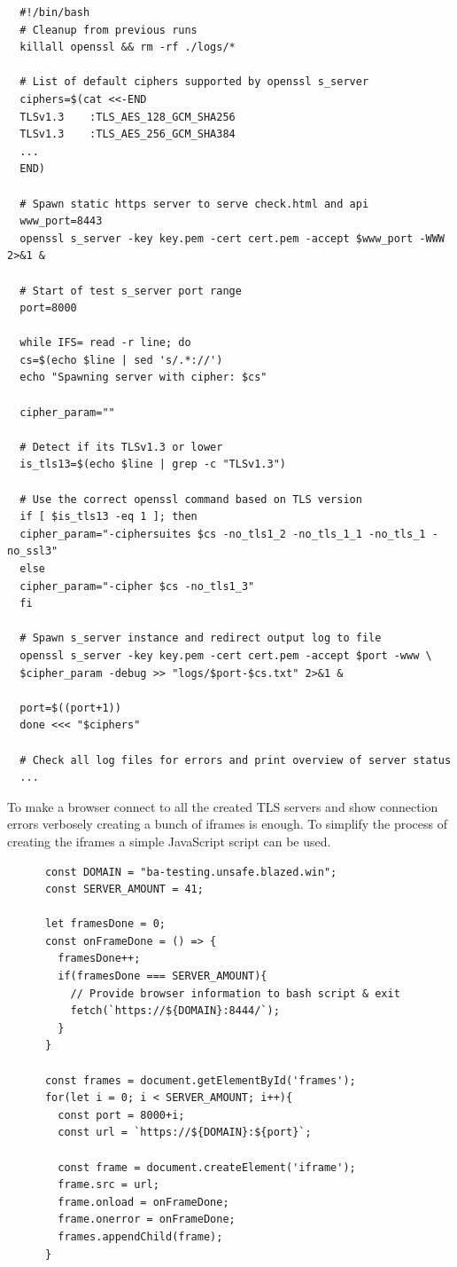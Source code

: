 \documentclass[12pt]{scrbook}
\begin{document}
\newpage

\begin{verbatim}
  #!/bin/bash
  # Cleanup from previous runs
  killall openssl && rm -rf ./logs/*

  # List of default ciphers supported by openssl s_server
  ciphers=$(cat <<-END
  TLSv1.3    :TLS_AES_128_GCM_SHA256
  TLSv1.3    :TLS_AES_256_GCM_SHA384
  ...
  END)

  # Spawn static https server to serve check.html and api
  www_port=8443
  openssl s_server -key key.pem -cert cert.pem -accept $www_port -WWW 2>&1 &

  # Start of test s_server port range
  port=8000

  while IFS= read -r line; do
  cs=$(echo $line | sed 's/.*://')
  echo "Spawning server with cipher: $cs"

  cipher_param=""

  # Detect if its TLSv1.3 or lower
  is_tls13=$(echo $line | grep -c "TLSv1.3")

  # Use the correct openssl command based on TLS version
  if [ $is_tls13 -eq 1 ]; then
  cipher_param="-ciphersuites $cs -no_tls1_2 -no_tls_1_1 -no_tls_1 -no_ssl3"
  else
  cipher_param="-cipher $cs -no_tls1_3"
  fi

  # Spawn s_server instance and redirect output log to file
  openssl s_server -key key.pem -cert cert.pem -accept $port -www \
  $cipher_param -debug >> "logs/$port-$cs.txt" 2>&1 &

  port=$((port+1))
  done <<< "$ciphers"

  # Check all log files for errors and print overview of server status
  ...
\end{verbatim}

\newpage

To make a browser connect to all the created TLS servers and show connection errors verbosely creating a bunch of iframes is enough.
To simplify the process of creating the iframes a simple JavaScript script can be used.

\begin{verbatim}
      const DOMAIN = "ba-testing.unsafe.blazed.win";
      const SERVER_AMOUNT = 41;

      let framesDone = 0;
      const onFrameDone = () => {
        framesDone++;
        if(framesDone === SERVER_AMOUNT){
          // Provide browser information to bash script & exit
          fetch(`https://${DOMAIN}:8444/`);
        }
      }

      const frames = document.getElementById('frames');
      for(let i = 0; i < SERVER_AMOUNT; i++){
        const port = 8000+i;
        const url = `https://${DOMAIN}:${port}`;

        const frame = document.createElement('iframe');
        frame.src = url;
        frame.onload = onFrameDone;
        frame.onerror = onFrameDone;
        frames.appendChild(frame);
      }

\end{verbatim}
\end{document}
